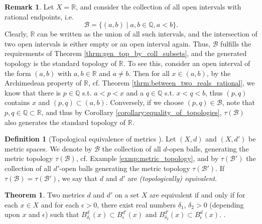 \documentclass[12pt, a4paper]{article}
\numberwithin{equation}{section}
\theoremstyle{definition}
\theoremstyle{definition}
\newtheorem{defn}[thm]{Definition} %
\newtheorem{remark}[thm]{Remark} %
\newtheorem{theorem}[thm]{Theorem}
\begin{document}
		\begin{remark}
			Let $X=\mathbb R$, and consider the collection of all open intervals with rational endpoints, i.e. 
			$$\mathscr B = \{(a, b)\mid a, b\in\mathbb Q, a < b\}.$$ Clearly, $\mathbb R$ can be written as the union of all such intervals, and the intersection of two open intervals is either empty or an open interval again. Thus, $\mathscr B$ fulfills the requirements of Theorem \ref{thrm:gen_top_by_coll_subsets}, and the generated topology is the standard topology of $\mathbb R$. To see this, consider an open interval of the form $(a, b)$ with $a, b\in\mathbb R$ and $a\ne b$. Then for all $x\in (a, b)$, by the Archimedean property of $\mathbb R$, cf. Theorem \ref{thrm:between_two_reals_rational}, we know that there is $p\in\mathbb Q$ s.t. $a < p < x$ and a $q\in\mathbb Q$ s.t. $x < q < b$, thus $(p, q)$ contains $x$ and $(p, q) \subset (a, b)$. Conversely, if we choose $(p, q)\in\mathscr B$, note that $p, q\in\mathbb Q\subset \mathbb R$, and thus by Corollary \ref{corollary:equality_of_topologies}, $\tau(\mathscr B)$ also generates the standard topology of $\mathbb R$.
		\end{remark}
	
		\begin{defn}[Topological equivalence of metrics \cite{topology-singh}]\label{defn:topological_equivalence_metrics}
			Let $(X, d)$ and $(X, d')$ be metric spaces. We denote by $\mathscr B$ the collection of all $d$-open balls, generating the metric topology $\tau(\mathscr B)$, cf. Example \ref{exmp:metric_topology}, and by $\tau(\mathscr B')$ the collection of all $d'$-open balls generating the metric topology $\tau(\mathscr B')$. If $\tau(\mathscr B) = \tau(\mathscr B')$, we say that $d$ and $d'$ are \textit{(topologically) equivalent}.
		\end{defn}
	
		\begin{theorem}\label{thrm:topological_equivalence}
			Two metrics $d$ and $d'$ on a set $X$ are equivalent if and only if for each $x\in X$ and for each $\epsilon > 0$, there exist real numbers $\delta_1$, $\delta_2 > 0$ (depending upon $x$ and $\epsilon$) such that $B^{d}_{\delta_1}(x) \subset B^{d'}_{\epsilon}(x)$ and $B^{d'}_{\delta_2}(x) \subset B^{d}_{\epsilon}(x)$. \cite{topology-singh}.
		\end{theorem}
		
\end{document}
